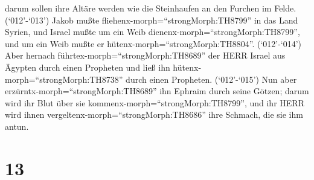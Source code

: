 darum sollen ihre Altäre werden wie die Steinhaufen an den Furchen im
Felde.  (`012'-`013') Jakob mußte
fliehenx-morph=``strongMorph:TH8799'' in das Land Syrien, und Israel
mußte um ein Weib dienenx-morph=``strongMorph:TH8799'', und um ein Weib
mußte er hütenx-morph=``strongMorph:TH8804''. 
(`012'-`014') Aber hernach führtex-morph=``strongMorph:TH8689'' der HERR
Israel aus Ägypten durch einen Propheten und ließ ihn
hütenx-morph=``strongMorph:TH8738'' durch einen Propheten. 
(`012'-`015') Nun aber erzürntx-morph=``strongMorph:TH8689'' ihn Ephraim
durch seine Götzen; darum wird ihr Blut über sie
kommenx-morph=``strongMorph:TH8799'', und ihr HERR wird ihnen
vergeltenx-morph=``strongMorph:TH8686'' ihre Schmach, die sie ihm antun.

\hypertarget{section-12}{%
\section{13}\label{section-12}}


